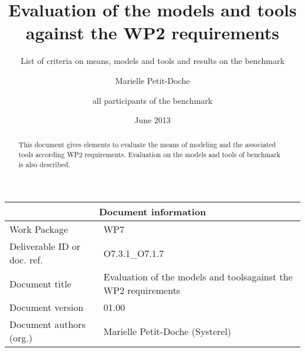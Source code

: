 \documentclass{template/openetcs_report}
\begin{document}
\frontmatter
{}




\title{Evaluation of the models and tools against the WP2 requirements }

\subtitle{List of criteria on means, models and tools and results on the benchmark}

\date{June 2013}


\author{Marielle Petit-Doche}


\author{all participants of the benchmark}

 


\begin{abstract}
This document gives elements to evaluate the means of modeling and the associated tools according WP2 requirements. Evaluation on the models and tools of benchmark is also described.

\end{abstract}

\maketitle
\tableofcontents
\listoffiguresandtables
\newpage


\begin{tabular}{|p{4.4cm}|p{8.7cm}|}
\hline
\multicolumn{2}{|c|}{Document information} \\
\hline
Work Package &  WP7  \\
Deliverable ID or doc. ref. & O7.3.1\_O7.1.7\\
\hline
Document title & Evaluation of the models and toolsagainst the WP2 requirements \\
Document version & 01.00 \\
Document authors (org.)  & Marielle Petit-Doche (Systerel)  \\
\hline
\end{tabular}
\end{document}
